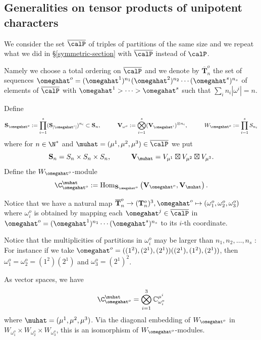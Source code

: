 \subsection{Generalities on tensor products of unipotent characters}



We consider the set $\overline{\calP}$ of triples of partitions of the same size and we repeat what we did in \S \ref{symmetric-section} with $\overline{\calP}$ instead of $\calP$. 

Namely we choose  a total ordering on $\overline{\calP}$ and we denote by $\overline{\mathbf{T}}_n^o$ the set of sequences $\omegahat^o=(\omegahat^1)^{n_1}(\omegahat^2)^{n_2}\cdots(\omegahat^s)^{n_s}$ of elements of $\overline{\calP}$ with $\omegahat^1>\cdots>\omegahat^s$ such that $\sum_in_i|\omega^i|=n$.

Define 
$$
{\mathbf{S}}_{\omegahat^o}:=\prod_{i=1}^s({\mathbf{S}}_{|\omegahat^i|})^{n_i}\subset {\mathbf{S}}_n,\hspace{1cm}{\mathbf{V}}_{\omega^o}:=\bigotimes_{i=1}^s({\mathbf{V}}_{\omegahat^i})^{\otimes n_i},\hspace{1cm}W_{\omegahat^o}:=\prod_{i=1}^s S_{n_i}
$$
where for $n\in\N^*$ and $\muhat=(\mu^1,\mu^2,\mu^3)\in\overline{\calP}$ we put
$$
{\mathbf{S}}_n=S_n\times S_n\times S_n,\hspace{1cm}{\mathbf{V}}_\muhat=V_{\mu^1}\boxtimes V_{\mu^2}\boxtimes V_{\mu^3}.
$$
Define the $W_{\omegahat^o}$-module
$$
\C^\muhat_{\omegahat^o}:={\rm Hom}_{{\mathbf{S}}_{\omegahat^o}}\left({\mathbf{V}}_{\omegahat^o},{\mathbf{V}}_\muhat\right).
$$
\begin{rema}Notice that we have a natural map $\overline{{\mathbf{T}}}_n^o\rightarrow ({\mathbf{T}}_n^o)^3, \omegahat^o\mapsto (\omega^o_1,\omega^o_2,\omega^o_3)$ where $\omega^o_i$ is obtained by mapping each $\omegahat^j\in\overline{\calP}$ in $\omegahat^o=(\omegahat^1)^{n_1}\cdots(\omegahat^s)^{n_s}$ to its $i$-th coordinate. 
	
	Notice that the multiplicities of partitions in $\omega_i^o$ may be larger than $n_1,n_2,\dots,n_s$ : 
	For instance if we take $\omegahat^o=((1^2),(2^1),(2^1))((2^1),(1^2),(2^1))$, then $\omega_1^o=\omega_2^o=(1^2)(2^1)$ and $\omega^o_3=(2^1)^2$. 
	
	As vector spaces, we have
	$$
	\C^\muhat_{\omegahat^o}=\bigotimes_{i=1}^3\mathbb{C}^{\mu^i}_{\omega_i ^o}
	$$
	where $\muhat=(\mu^1,\mu^2,\mu^3)$. Via the diagonal embedding of $W_{\omegahat^o}$ in $W_{\omega^o_1}\times W_{\omega^o_2}\times W_{\omega^o_3}$, this is an isomorphism of $W_{\omegahat^o}$-modules.
	
	
\end{rema}



